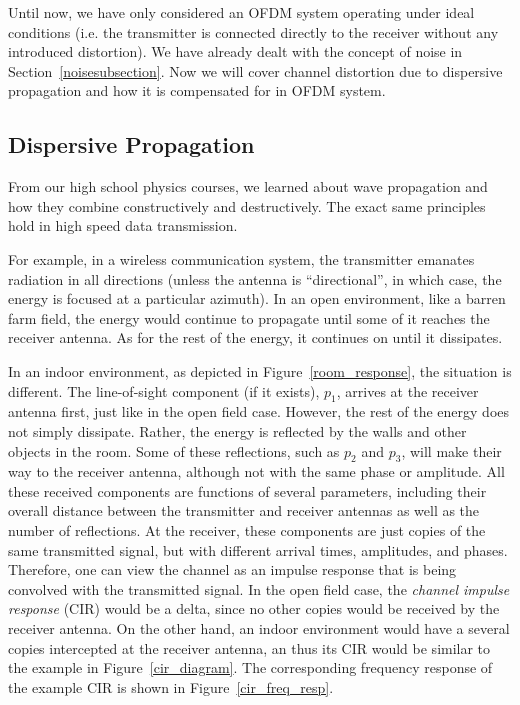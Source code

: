 \documentclass[12pt]{article}
\begin{document}
Until now, we have only considered an OFDM system operating under
ideal conditions (i.e. the transmitter is connected directly to
the receiver without any introduced distortion). We have already
dealt with the concept of noise in Section~\ref{noisesubsection}.
Now we will cover channel distortion due to dispersive propagation
and how it is compensated for in OFDM system.


\subsection{Dispersive Propagation}

From our high school physics courses, we learned about wave
propagation and how they combine constructively and destructively.
The exact same principles hold in high speed data transmission.

For example, in a wireless communication system, the transmitter
emanates radiation in all directions (unless the antenna is
``directional'', in which case, the energy is focused at a
particular azimuth). In an open environment, like a barren farm
field, the energy would continue to propagate until some of it
reaches the receiver antenna. As for the rest of the energy, it
continues on until it dissipates.

In an indoor environment, as depicted in
Figure~\ref{room_response}, the situation is different. The
line-of-sight component (if it exists), $p_1$, arrives at the
receiver antenna first, just like in the open field case. However,
the rest of the energy does not simply dissipate. Rather, the
energy is reflected by the walls and other objects in the room.
Some of these reflections, such as $p_2$ and $p_3$, will make
their way to the receiver antenna, although not with the same
phase or amplitude. All these received components are functions of
several parameters, including their overall distance between the
transmitter and receiver antennas as well as the number of
reflections. At the receiver, these components are just copies of
the same transmitted signal, but with different arrival times,
amplitudes, and phases. Therefore, one can view the channel as an
impulse response that is being convolved with the transmitted
signal. In the open field case, the {\it channel impulse response}
(CIR) would be a delta, since no other copies would be received by
the receiver antenna. On the other hand, an indoor environment
would have a several copies intercepted at the receiver antenna,
an thus its CIR would be similar to the example in
Figure~\ref{cir_diagram}. The corresponding frequency response of
the example CIR is shown in Figure~\ref{cir_freq_resp}.
\end{document}
